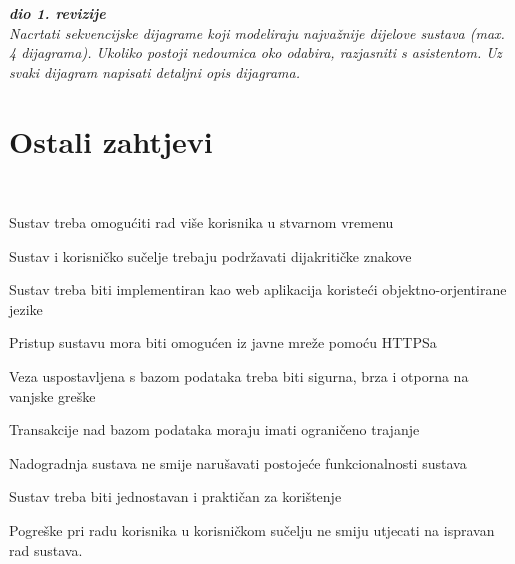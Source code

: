 				\textbf{\textit{dio 1. revizije}}\\
				
				\textit{Nacrtati sekvencijske dijagrame koji modeliraju najvažnije dijelove sustava (max. 4 dijagrama). Ukoliko postoji nedoumica oko odabira, razjasniti s asistentom. Uz svaki dijagram napisati detaljni opis dijagrama.}
				\eject
	
		\section{Ostali zahtjevi}\
		
			
	\begin{packed_item}
	
		\item {Sustav treba omogućiti rad više korisnika u stvarnom vremenu}
		\item {Sustav i korisničko sučelje trebaju podržavati dijakritičke znakove}	
		\item {Sustav treba biti implementiran kao web aplikacija koristeći objektno-orjentirane jezike}
		\item {Pristup sustavu mora biti omogućen iz javne mreže pomoću HTTPSa}
		\item {Veza uspostavljena s bazom podataka treba biti sigurna, brza i otporna na vanjske greške}
		\item {Transakcije nad bazom podataka moraju imati ograničeno trajanje}
		\item {Nadogradnja sustava ne smije narušavati postojeće funkcionalnosti sustava}
		\item {Sustav treba biti jednostavan i praktičan za korištenje}
		\item {Pogreške pri radu korisnika u korisničkom sučelju  ne smiju utjecati na ispravan rad sustava.}
	
	\end{packed_item}
		 	 
			 
			 
	